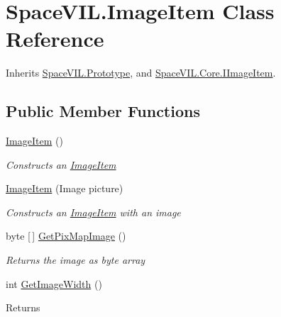 \hypertarget{class_space_v_i_l_1_1_image_item}{}\section{Space\+V\+I\+L.\+Image\+Item Class Reference}
\label{class_space_v_i_l_1_1_image_item}


Inherits \mbox{\hyperlink{class_space_v_i_l_1_1_prototype}{Space\+V\+I\+L.\+Prototype}}, and \mbox{\hyperlink{interface_space_v_i_l_1_1_core_1_1_i_image_item}{Space\+V\+I\+L.\+Core.\+I\+Image\+Item}}.

\subsection*{Public Member Functions}
\begin{DoxyCompactItemize}
\item 
\mbox{\hyperlink{class_space_v_i_l_1_1_image_item_afa5bd43ca4b8994abc75f357d74fb789}{Image\+Item}} ()
\begin{DoxyCompactList}\small\item\em Constructs an \mbox{\hyperlink{class_space_v_i_l_1_1_image_item}{Image\+Item}} \end{DoxyCompactList}\item 
\mbox{\hyperlink{class_space_v_i_l_1_1_image_item_abdb9336a73b8d73c87263d65a8531276}{Image\+Item}} (Image picture)
\begin{DoxyCompactList}\small\item\em Constructs an \mbox{\hyperlink{class_space_v_i_l_1_1_image_item}{Image\+Item}} with an image \end{DoxyCompactList}\item 
byte \mbox{[}$\,$\mbox{]} \mbox{\hyperlink{class_space_v_i_l_1_1_image_item_a85be98b3558beec30a134e2da5304fd5}{Get\+Pix\+Map\+Image}} ()
\begin{DoxyCompactList}\small\item\em Returns the image as byte array \end{DoxyCompactList}\item 
\mbox{\label{class_space_v_i_l_1_1_image_item_a4b376d93461249f32521324021b4509f}} 
int \mbox{\hyperlink{class_space_v_i_l_1_1_image_item_a4b376d93461249f32521324021b4509f}{Get\+Image\+Width}} ()
\begin{DoxyCompactList}\small\item\em \begin{DoxyReturn}{Returns}

\end{DoxyReturn}
\end{DoxyCompactList}
\end{DoxyCompactItemize}
